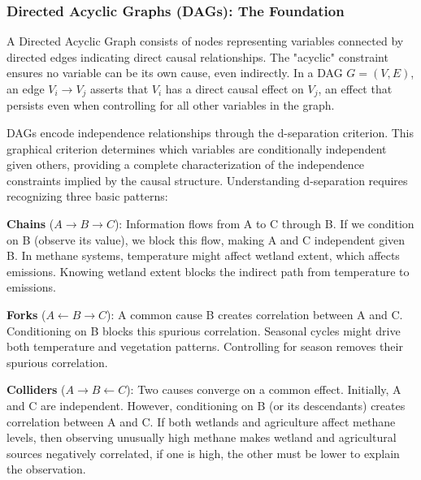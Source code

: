 \subsubsection{Directed Acyclic Graphs (DAGs): The Foundation}

A Directed Acyclic Graph consists of nodes representing variables connected by directed edges indicating direct causal relationships. The "acyclic" constraint ensures no variable can be its own cause, even indirectly. In a DAG $G = (V, E)$, an edge $V_i \rightarrow V_j$ asserts that $V_i$ has a direct causal effect on $V_j$, an effect that persists even when controlling for all other variables in the graph.

DAGs encode independence relationships through the d-separation criterion. This graphical criterion determines which variables are conditionally independent given others, providing a complete characterization of the independence constraints implied by the causal structure. Understanding d-separation requires recognizing three basic patterns:

\textbf{Chains} ($A \rightarrow B \rightarrow C$): Information flows from A to C through B. If we condition on B (observe its value), we block this flow, making A and C independent given B. In methane systems, temperature might affect wetland extent, which affects emissions. Knowing wetland extent blocks the indirect path from temperature to emissions.

\textbf{Forks} ($A \leftarrow B \rightarrow C$): A common cause B creates correlation between A and C. Conditioning on B blocks this spurious correlation. Seasonal cycles might drive both temperature and vegetation patterns. Controlling for season removes their spurious correlation.

\textbf{Colliders} ($A \rightarrow B \leftarrow C$): Two causes converge on a common effect. Initially, A and C are independent. However, conditioning on B (or its descendants) creates correlation between A and C. If both wetlands and agriculture affect methane levels, then observing unusually high methane makes wetland and agricultural sources negatively correlated, if one is high, the other must be lower to explain the observation.

